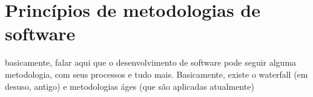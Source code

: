 \chapter{Princípios de metodologias de software}

basicamente, falar aqui que o desenvolvimento de software pode seguir alguma 
metodologia, com seus processos e tudo mais.
Basicamente, existe o waterfall (em desuso, antigo) e
metodologias áges (que são aplicadas atualmente)
